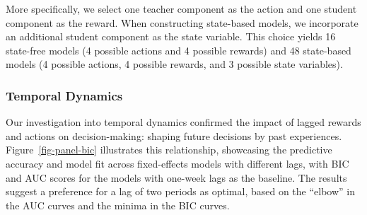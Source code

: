 \documentclass[
  number,
  preprint,
  3p,
  onecolumn]{elsarticle}
\begin{document}
More specifically, we select one teacher component as the action and one
student component as the reward. When constructing state-based models,
we incorporate an additional student component as the state variable.
This choice yields 16 state-free models (4 possible actions and 4
possible rewards) and 48 state-based models (4 possible actions, 4
possible rewards, and 3 possible state variables).

\subsubsection{Temporal Dynamics}\label{temporal-dynamics}

Our investigation into temporal dynamics confirmed the impact of lagged
rewards and actions on decision-making: shaping future decisions by past
experiences. Figure~\ref{fig-panel-bic} illustrates this relationship,
showcasing the predictive accuracy and model fit across fixed-effects
models with different lags, with BIC and AUC scores for the models with
one-week lags as the baseline. The results suggest a preference for a
lag of two periods as optimal, based on the ``elbow'' in the AUC curves
and the minima in the BIC curves.
\end{document}
